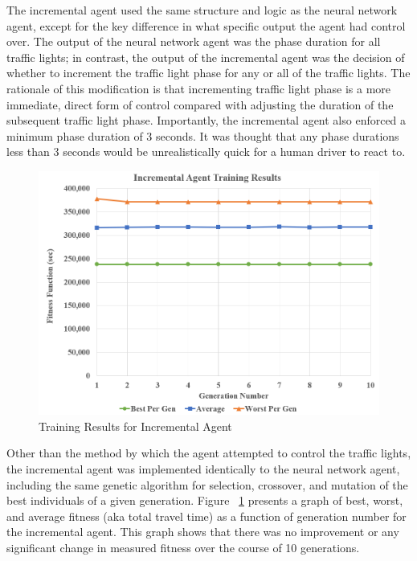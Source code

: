 \documentclass[twocolumn]{article}
\begin{document}
The incremental agent used the same structure and logic as the neural network agent, except for the key difference in what specific output the agent had control over. The output of the neural network agent was the phase duration for all traffic lights; in contrast, the output of the incremental agent was the decision of whether to increment the traffic light phase for any or all of the traffic lights. The rationale of this modification is that incrementing traffic light phase is a more immediate, direct form of control compared with adjusting the duration of the subsequent traffic light phase. Importantly, the incremental agent also enforced a minimum phase duration of 3 seconds. It was thought that any phase durations less than 3 seconds would be unrealistically quick for a human driver to react to.

\begin{figure}[htp]
    \centering
    \includegraphics[width=\linewidth]{figures/inc_agent_training.PNG}
    \caption{Training Results for Incremental Agent}
    \label{fig:inc_agent_training}
\end{figure}

Other than the method by which the agent attempted to control the traffic lights, the incremental agent was implemented identically to the neural network agent, including the same genetic algorithm for selection, crossover, and mutation of the best individuals of a given generation. Figure ~\ref{fig:inc_agent_training} presents a graph of best, worst, and average fitness (aka total travel time) as a function of generation number for the incremental agent. This graph shows that there was no improvement or any significant change in measured fitness over the course of 10 generations.
\end{document}
